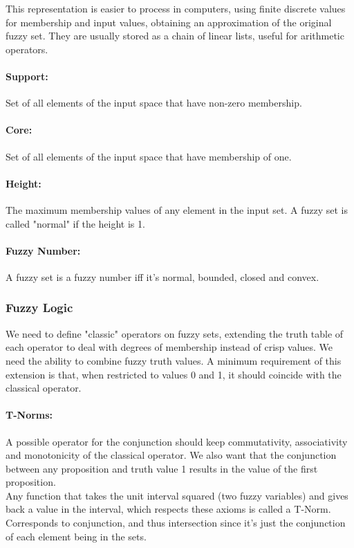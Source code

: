 This representation is easier to process in computers, using finite discrete values for membership and input values, obtaining an approximation of the original fuzzy set. They are usually stored as a chain of linear lists, useful for arithmetic operators.\\

\paragraph{Support:} Set of all elements of the input space that have non-zero membership.

\paragraph{Core:} Set of all elements of the input space that have membership of one.

\paragraph{Height:} The maximum membership values of any element in the input set. A fuzzy set is called "normal" if the height is 1.

\paragraph{Fuzzy Number:} A fuzzy set is a fuzzy number iff it's normal, bounded, closed and convex.\\

\subsubsection{Fuzzy Logic}
We need to define "classic" operators on fuzzy sets, extending the truth table of each operator to deal with degrees of membership instead of crisp values. We need the ability to combine fuzzy truth values. A minimum requirement of this extension is that, when restricted to values 0 and 1, it should coincide with the classical operator. \\

\paragraph{T-Norms:} A possible operator for the conjunction should keep commutativity, associativity and monotonicity of the classical operator. We also want that the conjunction between any proposition and truth value 1 results in the value of the first proposition. \\
Any function that takes the unit interval squared (two fuzzy variables) and gives back a value in the interval, which respects these axioms is called a T-Norm. Corresponds to conjunction, and thus intersection since it's just the conjunction of each element being in the sets.\\

